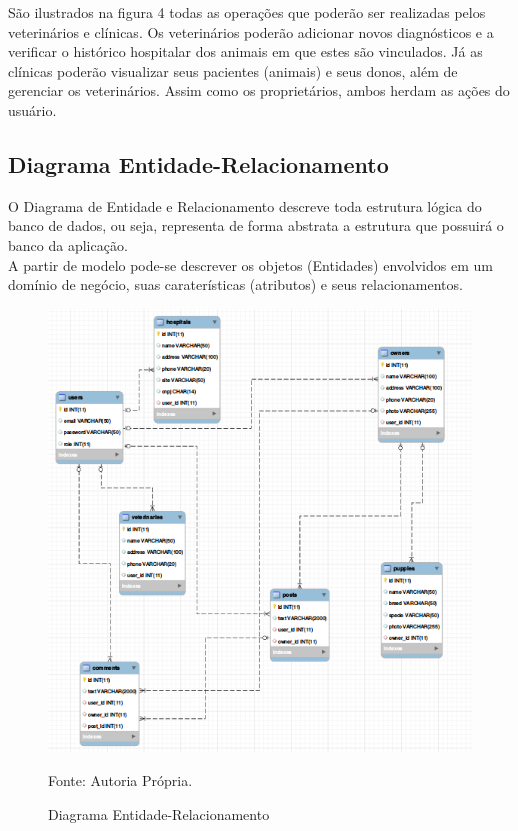 São ilustrados na figura 4 todas as operações que poderão ser realizadas pelos veterinários e clínicas. Os veterinários poderão adicionar novos diagnósticos e a verificar o histórico hospitalar dos animais em que estes são vinculados. Já as clínicas poderão visualizar seus pacientes (animais) e seus donos, além de gerenciar os veterinários. Assim como os proprietários, ambos herdam as ações do usuário.

\subsection{Diagrama Entidade-Relacionamento}
O Diagrama de Entidade e Relacionamento descreve toda estrutura lógica do banco de dados,  ou seja, representa de forma abstrata a estrutura que possuirá o banco da aplicação.
\\
\indent
A partir de modelo pode-se descrever os objetos (Entidades) envolvidos em um domínio de negócio, suas caraterísticas (atributos) e seus relacionamentos.

\begin{figure}[h!]
	\centering	\includegraphics[scale=0.80
	]{imagens/entidaderelacionamento}
	\caption{Diagrama Entidade-Relacionamento}
	Fonte: Autoria Própria.
	\label{Rotulo}
\end{figure}

